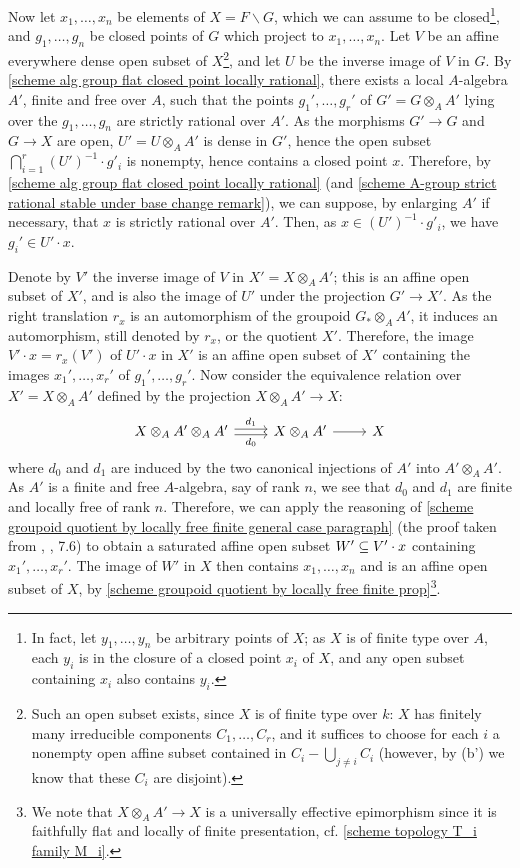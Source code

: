 Now let $x_1,\dots,x_n$ be elements of $X=F\backslash G$, which we can assume to be closed\footnote{In fact, let $y_1,\dots,y_n$ be arbitrary points of $X$; as $X$ is of finite type over $A$, each $y_i$ is in the closure of a closed point $x_i$ of $X$, and any open subset containing $x_i$ also contains $y_i$.}, and $g_1,\dots,g_n$ be closed points of $G$ which project to $x_1,\dots,x_n$. Let $V$ be an affine everywhere dense open subset of $X$\footnote{Such an open subset exists, since $X$ is of finite type over $k$: $X$ has finitely many irreducible components $C_1,\dots,C_r$, and it suffices to choose for each $i$ a nonempty open affine subset contained in $C_i-\bigcup_{j\neq i}C_i$ (however, by (b') we know that these $C_i$ are disjoint).}, and let $U$ be the inverse image of $V$ in $G$. By \cref{scheme alg group flat closed point locally rational}, there exists a local $A$-algebra $A'$, finite and free over $A$, such that the points $g_1',\dots,g_r'$ of $G'=G\otimes_AA'$ lying over the $g_1,\dots,g_n$ are strictly rational over $A'$. As the morphisms $G'\to G$ and $G\to X$ are open, $U'=U\otimes_AA'$ is dense in $G'$, hence the open subset $\bigcap_{i=1}^{r}(U')^{-1}\cdot g'_i$ is nonempty, hence contains a closed point $x$. Therefore, by \cref{scheme alg group flat closed point locally rational} (and \cref{scheme A-group strict rational stable under base change remark}), we can suppose, by enlarging $A'$ if necessary, that $x$ is strictly rational over $A'$. Then, as $x\in(U')^{-1}\cdot g'_i$, we have $g_i'\in U'\cdot x$.\par

Denote by $V'$ the inverse image of $V$ in $X'=X\otimes_AA'$; this is an affine open subset of $X'$, and is also the image of $U'$ under the projection $G'\to X'$. As the right translation $r_x$ is an automorphism of the groupoid $G_*\otimes_AA'$, it induces an automorphism, still denoted by $r_x$, or the quotient $X'$. Therefore, the image $V'\cdot x=r_x(V')$ of $U'\cdot x$ in $X'$ is an affine open subset of $X'$ containing the images $x_1',\dots,x_r'$ of $g_1',\dots,g_r'$. Now consider the equivalence relation over $X'=X\otimes_AA'$ defined by the projection $X\otimes_AA'\to X$:
\[\begin{tikzcd}
X\otimes_AA'\otimes_AA'\ar[r,shift left=2pt,"d_1"]\ar[r,shift right=2pt,swap,"d_0"]&X\otimes_AA'\ar[r]&X
\end{tikzcd}\]
where $d_0$ and $d_1$ are induced by the two canonical injections of $A'$ into $A'\otimes_AA'$. As $A'$ is a finite and free $A$-algebra, say of rank $n$, we see that $d_0$ and $d_1$ are finite and locally free of rank $n$. Therefore, we can apply the reasoning of \ref{scheme groupoid quotient by locally free finite general case paragraph} (the proof taken from \cite{SGA1}, , 7.6) to obtain a saturated affine open subset $W'\subseteq V'\cdot x$ containing $x_1',\dots,x_r'$. The image of $W'$ in $X$ then contains $x_1,\dots,x_n$ and is an affine open subset of $X$, by \cref{scheme groupoid quotient by locally free finite prop}\footnote{We note that $X\otimes_AA'\to X$ is a universally effective epimorphism since it is faithfully flat and locally of finite presentation, cf. \cref{scheme topology T_i family M_i}.}.\par

